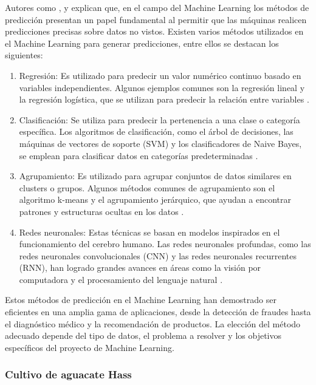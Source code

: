 \newpage
Autores como \citet{contreras2022}, \citet{salamanca2021} y \citet{jara2016} explican que, en el campo del Machine Learning los métodos de predicción presentan un papel fundamental al permitir que las máquinas realicen predicciones precisas sobre datos no vistos. Existen varios métodos utilizados en el Machine Learning para generar predicciones, entre ellos se destacan los siguientes:

\begin{enumerate}
    \item Regresión: Es utilizado para predecir un valor numérico continuo basado en variables independientes. Algunos ejemplos comunes son la regresión lineal y la regresión logística, que se utilizan para predecir la relación entre variables \citep{salamanca2021}.
    \item Clasificación: Se utiliza para predecir la pertenencia a una clase o categoría específica. Los algoritmos de clasificación, como el árbol de decisiones, las máquinas de vectores de soporte (SVM) y los clasificadores de Naive Bayes, se emplean para clasificar datos en categorías predeterminadas \citep{salamanca2021}.
    \item Agrupamiento: Es utilizado para agrupar conjuntos de datos similares en clusters o grupos. Algunos métodos comunes de agrupamiento son el algoritmo k-means y el agrupamiento jerárquico, que ayudan a encontrar patrones y estructuras ocultas en los datos \citep{contreras2022}.
    \item Redes neuronales: Estas técnicas se basan en modelos inspirados en el funcionamiento del cerebro humano. Las redes neuronales profundas, como las redes neuronales convolucionales (CNN) y las redes neuronales recurrentes (RNN), han logrado grandes avances en áreas como la visión por computadora y el procesamiento del lenguaje natural \citep{salamanca2021}.
\end{enumerate}

Estos métodos de predicción en el Machine Learning han demostrado ser eficientes en una amplia gama de aplicaciones, desde la detección de fraudes hasta el diagnóstico médico y la recomendación de productos. La elección del método adecuado depende del tipo de datos, el problema a resolver y los objetivos específicos del proyecto de Machine Learning.


\subsubsection{Cultivo de aguacate Hass}

